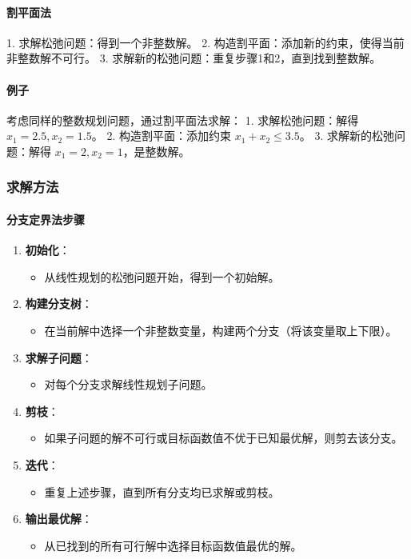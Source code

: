 \documentclass[UTF8]{ctexart}
\begin{document}
\paragraph{割平面法}
1. 求解松弛问题：得到一个非整数解。
2. 构造割平面：添加新的约束，使得当前非整数解不可行。
3. 求解新的松弛问题：重复步骤1和2，直到找到整数解。

\paragraph{例子}
考虑同样的整数规划问题，通过割平面法求解：
1. 求解松弛问题：解得 \(x_1 = 2.5, x_2 = 1.5\)。
2. 构造割平面：添加约束 \(x_1 + x_2 \leq 3.5\)。
3. 求解新的松弛问题：解得 \(x_1 = 2, x_2 = 1\)，是整数解。

\subsubsection {求解方法}
\paragraph{分支定界法步骤}
\begin{enumerate}
    \item \textbf{初始化}：
        \begin{itemize}
            \item 从线性规划的松弛问题开始，得到一个初始解。
        \end{itemize}
    \item \textbf{构建分支树}：
        \begin{itemize}
            \item 在当前解中选择一个非整数变量，构建两个分支（将该变量取上下限）。
        \end{itemize}
    \item \textbf{求解子问题}：
        \begin{itemize}
            \item 对每个分支求解线性规划子问题。
        \end{itemize}
    \item \textbf{剪枝}：
        \begin{itemize}
            \item 如果子问题的解不可行或目标函数值不优于已知最优解，则剪去该分支。
        \end{itemize}
    \item \textbf{迭代}：
        \begin{itemize}
            \item 重复上述步骤，直到所有分支均已求解或剪枝。
        \end{itemize}
    \item \textbf{输出最优解}：
        \begin{itemize}
            \item 从已找到的所有可行解中选择目标函数值最优的解。
        \end{itemize}
\end{enumerate}
\end{document}
